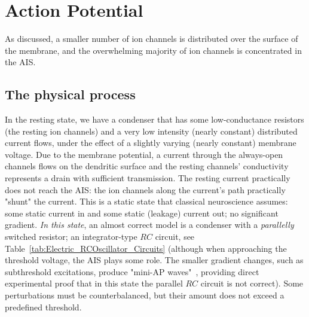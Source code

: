 
\chapter{Action Potential\label{ch:ActionPotential}}

\iflatexml
\else
\minitoc
\fi



As discussed, a smaller number of ion channels is distributed over the surface of the membrane, and the overwhelming majority of ion channels is concentrated in the \gls{AIS}.


\section{The physical process\label{sec:AP-PhysicalProcess}}

In the resting state, we have a condenser that has some low-conductance resistors (the resting ion channels) and a very low intensity (nearly constant) distributed current flows, under the effect of a slightly varying (nearly constant) membrane voltage. Due to the membrane potential, a current through the always-open channels flows on the dendritic surface
and the resting channels' conductivity represents a drain with 
sufficient transmission. The resting current practically does not 
reach the \gls{AIS}: the ion channels along the current's path
practically "shunt" the current.
This is a static state that classical neuroscience assumes: some static current in and some static (leakage) current out; no significant gradient.
\textit{In this state}, an almost correct model is a condenser with a
\textit{parallelly} switched resistor; an integrator-type  $RC$ circuit, see Table~\ref{tab:Electric_RCOscillator_Circuits}
(although when approaching the threshold voltage, the \gls{AIS} plays some role. The smaller gradient changes, such as subthreshold excitations, produce "mini-\gls{AP} waves"~\cite{NeuralEnergyConsumption:2017}, providing direct experimental proof that in this state the parallel $RC$ circuit is not correct).
Some perturbations must be counterbalanced, but their
amount does not exceed a predefined threshold.

